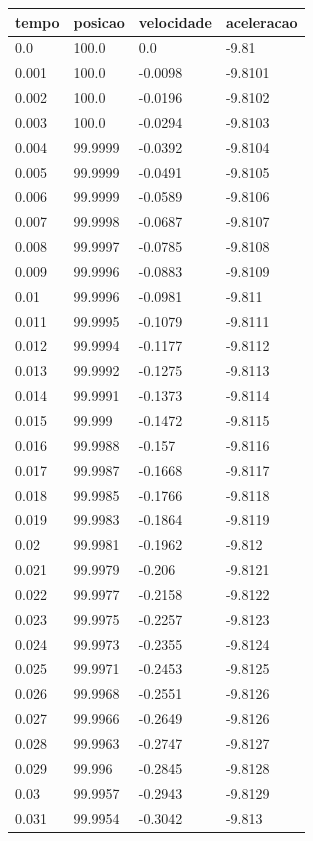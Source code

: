 \begin{tabular}{llll}
\toprule
tempo & posicao & velocidade & aceleracao \\
\midrule
0.0 & 100.0 & 0.0 & -9.81 \\
0.001 & 100.0 & -0.0098 & -9.8101 \\
0.002 & 100.0 & -0.0196 & -9.8102 \\
0.003 & 100.0 & -0.0294 & -9.8103 \\
0.004 & 99.9999 & -0.0392 & -9.8104 \\
0.005 & 99.9999 & -0.0491 & -9.8105 \\
0.006 & 99.9999 & -0.0589 & -9.8106 \\
0.007 & 99.9998 & -0.0687 & -9.8107 \\
0.008 & 99.9997 & -0.0785 & -9.8108 \\
0.009 & 99.9996 & -0.0883 & -9.8109 \\
0.01 & 99.9996 & -0.0981 & -9.811 \\
0.011 & 99.9995 & -0.1079 & -9.8111 \\
0.012 & 99.9994 & -0.1177 & -9.8112 \\
0.013 & 99.9992 & -0.1275 & -9.8113 \\
0.014 & 99.9991 & -0.1373 & -9.8114 \\
0.015 & 99.999 & -0.1472 & -9.8115 \\
0.016 & 99.9988 & -0.157 & -9.8116 \\
0.017 & 99.9987 & -0.1668 & -9.8117 \\
0.018 & 99.9985 & -0.1766 & -9.8118 \\
0.019 & 99.9983 & -0.1864 & -9.8119 \\
0.02 & 99.9981 & -0.1962 & -9.812 \\
0.021 & 99.9979 & -0.206 & -9.8121 \\
0.022 & 99.9977 & -0.2158 & -9.8122 \\
0.023 & 99.9975 & -0.2257 & -9.8123 \\
0.024 & 99.9973 & -0.2355 & -9.8124 \\
0.025 & 99.9971 & -0.2453 & -9.8125 \\
0.026 & 99.9968 & -0.2551 & -9.8126 \\
0.027 & 99.9966 & -0.2649 & -9.8126 \\
0.028 & 99.9963 & -0.2747 & -9.8127 \\
0.029 & 99.996 & -0.2845 & -9.8128 \\
0.03 & 99.9957 & -0.2943 & -9.8129 \\
0.031 & 99.9954 & -0.3042 & -9.813 \\

\end{tabular}
